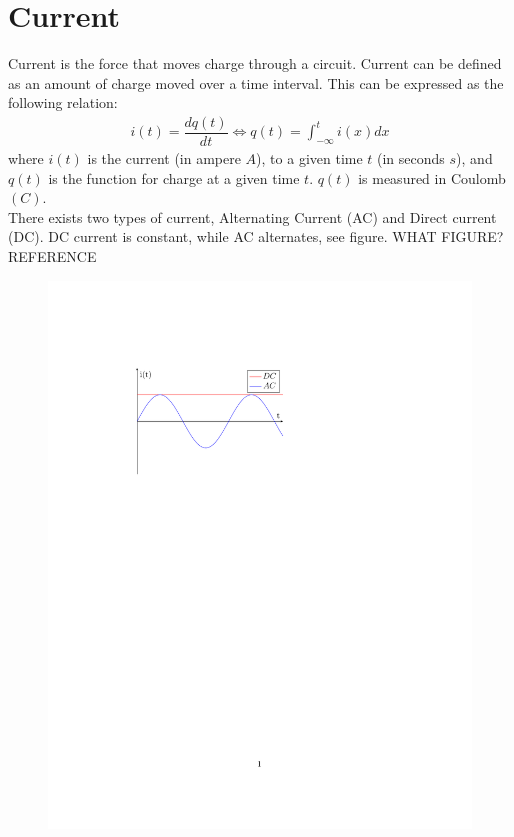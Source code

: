 \section{Current}
Current is the force that moves charge through a circuit. Current can be defined as an amount of charge moved over a time interval. This can be expressed as the following relation:
\begin{align}
i(t)=\dfrac{dq(t)}{dt} \Leftrightarrow q(t)=\int_{-\infty}^{t}i(x)dx
\end{align}
where $i(t)$ is the current (in ampere $A$), to a given time $t$ (in seconds $s$), and $q(t)$ is the function for charge at a given time $t$. $q(t)$ is measured in Coulomb$(C)$.
\\
There exists two types of current, Alternating Current (AC) and Direct current (DC). DC current is constant, while AC alternates, see figure. WHAT FIGURE? REFERENCE
\\
\begin{figure}
 \includegraphics{fig/img/ACDC.pdf}
\end{figure}
